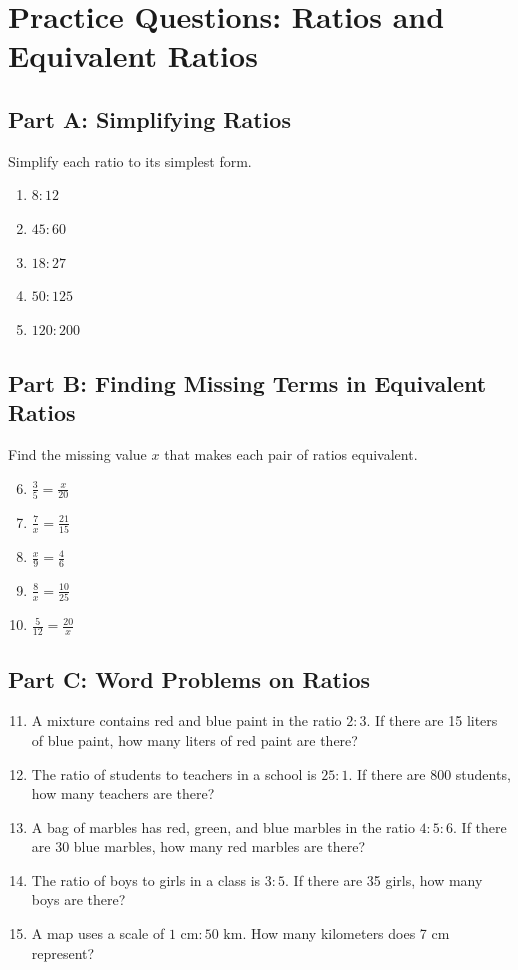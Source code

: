 \documentclass[14pt]{extarticle}
\begin{document}

\section*{Practice Questions: Ratios and Equivalent Ratios}

\subsection*{Part A: Simplifying Ratios}
Simplify each ratio to its simplest form.
\begin{enumerate}
  \item \(8:12\)
  \item \(45:60\)
  \item \(18:27\)
  \item \(50:125\)
  \item \(120:200\)
\end{enumerate}

\subsection*{Part B: Finding Missing Terms in Equivalent Ratios}
Find the missing value \(x\) that makes each pair of ratios equivalent.
\begin{enumerate}
  \setcounter{enumi}{5}
  \item \(\frac{3}{5} = \frac{x}{20}\)
  \item \(\frac{7}{x} = \frac{21}{15}\)
  \item \(\frac{x}{9} = \frac{4}{6}\)
  \item \(\frac{8}{x} = \frac{10}{25}\)
  \item \(\frac{5}{12} = \frac{20}{x}\)
\end{enumerate}

\subsection*{Part C: Word Problems on Ratios}
\begin{enumerate}
  \setcounter{enumi}{10}
  \item A mixture contains red and blue paint in the ratio \(2:3\). If there are 15 liters of blue paint, how many liters of red paint are there?
  \item The ratio of students to teachers in a school is \(25:1\). If there are 800 students, how many teachers are there?
  \item A bag of marbles has red, green, and blue marbles in the ratio \(4:5:6\). If there are 30 blue marbles, how many red marbles are there?
  \item The ratio of boys to girls in a class is \(3:5\). If there are 35 girls, how many boys are there?
  \item A map uses a scale of \(1 \text{ cm} : 50 \text{ km}\). How many kilometers does 7 cm represent?
\end{enumerate}
\end{document}
